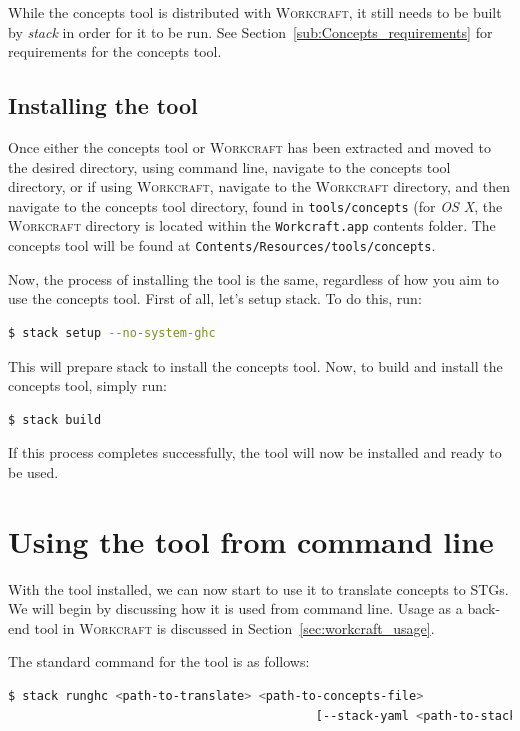 \documentclass{proc}
\newcommand{\noun}[1]{\textsc{#1}}
\begin{document}
While the concepts tool is distributed with \noun{Workcraft}, it still needs to be built by \emph{stack} in order for it to be run. 
See Section~\ref{sub:Concepts_requirements} for requirements for the concepts tool.

\newpage
\subsection{Installing the tool}

Once either the concepts tool or \noun{Workcraft} has been extracted and moved to the desired directory, using command line, navigate to the concepts tool directory, or if using 
\noun{Workcraft}, navigate to the \noun{Workcraft} directory, and then navigate to the concepts tool directory, found in \texttt{tools/concepts} (for \emph{OS X}, the 
\noun{Workcraft} directory is located within the \texttt{Workcraft.app} contents folder. The concepts tool will be found at \texttt{Contents/Resources/tools/concepts}.

Now, the process of installing the tool is the same, regardless of how you aim to use the concepts tool. First of all, let's setup stack. To do this, run: 

\begin{lstlisting}[language=bash]
  $ stack setup --no-system-ghc
\end{lstlisting}

This will prepare stack to install the concepts tool. Now, to build and install the concepts tool, simply run:

\begin{lstlisting}[language=bash]
  $ stack build
\end{lstlisting}

If this process completes successfully, the tool will now be installed and ready to be used.

\section{Using the tool from command line}

With the tool installed, we can now start to use it to translate concepts to STGs. We will begin by discussing how it is used from command line. Usage as a back-end tool in 
\noun{Workcraft} is discussed in Section~\ref{sec:workcraft_usage}.

The standard command for the tool is as follows:

\begin{lstlisting}[language=bash]
  $ stack runghc <path-to-translate> <path-to-concepts-file> 
                                           [--stack-yaml <path-to-stack-file>]
\end{lstlisting}
\end{document}

